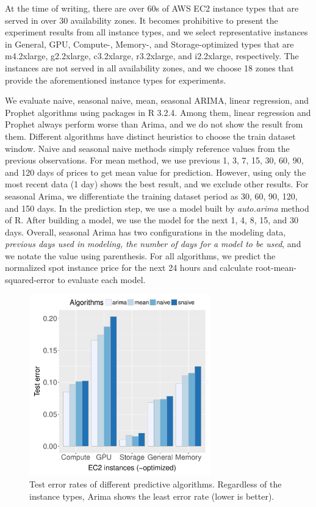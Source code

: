 \documentclass[graybox]{svmult}
\begin{document}
At the time of writing, there are over 60s of AWS EC2 instance types that are served in over 30 availability zones. It becomes prohibitive to present the experiment results from all instance types, and we select representative instances in General, GPU, Compute-, Memory-, and Storage-optimized types that are m4.2xlarge, g2.2xlarge, c3.2xlarge, r3.2xlarge, and i2.2xlarge, respectively. The instances are not served in all availability zones, and we choose 18 zones that provide the aforementioned instance types for experiments.

We evaluate naive, seasonal naive, mean, seasonal ARIMA, linear regression, and Prophet algorithms using packages in R 3.2.4. Among them, linear regression and Prophet always perform worse than Arima, and we do not show the result from them. Different algorithms have distinct heuristics to choose the train dataset window. Naive and seasonal naive methods simply reference values from the previous observations. For mean method, we use previous 1, 3, 7, 15, 30, 60, 90, and 120 days of prices to get mean value for prediction. However, using only the most recent data (1 day) shows the best result, and we exclude other results. For seasonal Arima, we differentiate the training dataset period as 30, 60, 90, 120, and 150 days. In the prediction step, we use a model built by \textit{auto.arima} method of R. After building a model, we use the model for the next 1, 4, 8, 15, and 30 days. Overall, seasonal Arima has two configurations in the modeling data, \emph{previous days used in modeling, the number of days for a model to be used}, and we notate the value using parenthesis. For all algorithms, we predict the normalized spot instance price for the next 24 hours and calculate root-mean-squared-error to evaluate each model.

\begin{figure}
  \centering\includegraphics[width=0.7\textwidth]{figures/algorithm-compare-different-instance-type.pdf}\caption{Test error rates of different predictive algorithms. Regardless of the instance types, Arima shows the least error rate (lower is better).\label{fig:algo-diff-inst}}
\end{figure}
\end{document}
